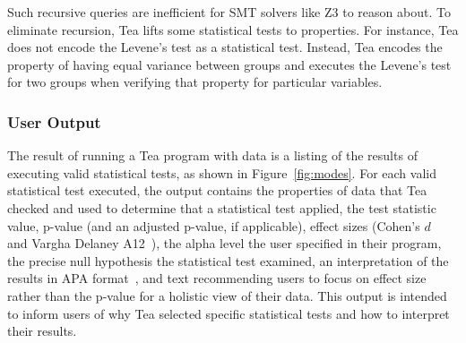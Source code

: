 Such recursive queries are inefficient for SMT solvers like Z3 to reason
about. To eliminate recursion, Tea lifts some statistical tests to properties.
For instance, Tea does not encode the Levene's test as a statistical test.
Instead, Tea encodes the property of having equal variance between groups and
executes the Levene's test for two groups when verifying that property for particular variables.
\vspace{-3pt}

\vspace{-2pt}
\subsubsection{User Output}
The result of running a Tea program with data is a listing of the results of
executing valid statistical tests, as shown in Figure~\ref{fig:modes}. For each valid
statistical test executed, the output contains the properties of data that Tea
checked and used to determine that a statistical test applied, the test
statistic value, p-value (and an adjusted p-value, if applicable), effect sizes
(Cohen's $d$~\cite{cohen1988statistical} and Vargha Delaney
A12~\cite{vargha2000critique}), the alpha level the user specified in their
program, the precise null hypothesis the statistical test examined, an
interpretation of the results in APA format~\cite{american1983publication}, and text
recommending users to focus on effect size rather than the p-value for a
holistic view of their data. This output is intended to inform users of why Tea
selected specific statistical tests and how to interpret their results.

